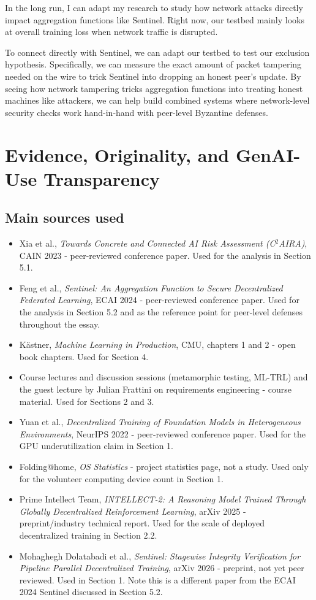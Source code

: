 \documentclass[11pt,a4paper]{article}
\begin{document}
In the long run, I can adapt my research to study how network attacks directly impact aggregation functions like Sentinel. Right now, our testbed mainly looks at overall training loss when network traffic is disrupted.

To connect directly with Sentinel, we can adapt our testbed to test our exclusion hypothesis. Specifically, we can measure the exact amount of packet tampering needed on the wire to trick Sentinel into dropping an honest peer's update. By seeing how network tampering tricks aggregation functions into treating honest machines like attackers, we can help build combined systems where network-level security checks work hand-in-hand with peer-level Byzantine defenses.

\section{Evidence, Originality, and GenAI-Use Transparency}
\subsection*{Main sources used}

\begin{itemize}
  \item Xia et al., \emph{Towards Concrete and Connected AI Risk Assessment (C$^2$AIRA)}, CAIN 2023 - peer-reviewed conference paper. Used for the analysis in Section 5.1.
  \item Feng et al., \emph{Sentinel: An Aggregation Function to Secure Decentralized Federated Learning}, ECAI 2024 - peer-reviewed conference paper. Used for the analysis in Section 5.2 and as the reference point for peer-level defenses throughout the essay.
  \item Kästner, \emph{Machine Learning in Production}, CMU, chapters 1 and 2 - open book chapters. Used for Section 4.
  \item Course lectures and discussion sessions (metamorphic testing, ML-TRL) and the guest lecture by Julian Frattini on requirements engineering - course material. Used for Sections 2 and 3.
  \item Yuan et al., \emph{Decentralized Training of Foundation Models in Heterogeneous Environments}, NeurIPS 2022 - peer-reviewed conference paper. Used for the GPU underutilization claim in Section 1.
  \item Folding@home, \emph{OS Statistics} - project statistics page, not a study. Used only for the volunteer computing device count in Section 1.
  \item Prime Intellect Team, \emph{INTELLECT-2: A Reasoning Model Trained Through Globally Decentralized Reinforcement Learning}, arXiv 2025 - preprint/industry technical report. Used for the scale of deployed decentralized training in Section 2.2.
  \item Mohaghegh Dolatabadi et al., \emph{Sentinel: Stagewise Integrity Verification for Pipeline Parallel Decentralized Training}, arXiv 2026 - preprint, not yet peer reviewed. Used in Section 1. Note this is a different paper from the ECAI 2024 Sentinel discussed in Section 5.2.
\end{itemize}
\end{document}
